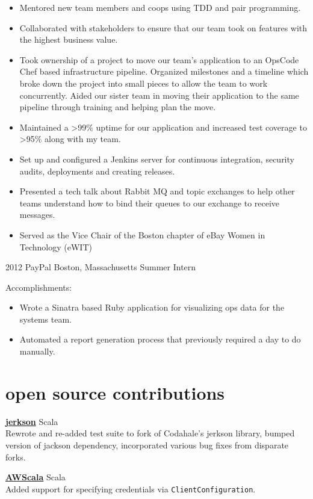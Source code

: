 \documentclass[]{friggeri-cv}
\begin{document}
\begin{entrylist}
{\begin{itemize}
      \item Mentored new team members and coops using TDD and pair programming.
      \item Collaborated with stakeholders to ensure that our team took on features with the highest business value.
      \item Took ownership of a project to move our team's application to an OpsCode Chef based infrastructure pipeline. Organized milestones and a timeline which broke down the project into small pieces to allow the team to work concurrently. Aided our sister team in moving their application to the same pipeline through training and helping plan the move.
      \item Maintained a >99\% uptime for our application and increased test coverage to >95\% along with my team.
      \item Set up and configured a Jenkins server for continuous integration, security audits, deployments and creating releases.
      \item Presented a tech talk about Rabbit MQ and topic exchanges to help other teams understand how to bind their queues to our exchange to receive messages.
      \item Served as the Vice Chair of the Boston chapter of eBay Women in Technology (eWIT)
    \end{itemize}}
  \entryalt
    {2012}
    {PayPal}
    {Boston, Massachusetts}
    {Summer Intern}
    {Accomplishments:
    \begin{itemize}
      \item Wrote a Sinatra based Ruby application for visualizing ops data for the systems team.
      \item Automated a report generation process that previously required a day to do manually.
    \end{itemize}}
\end{entrylist}

\section{open source contributions}

{\href{https://github.com/gilt/jerkson}{\textbf{jerkson}}} \hfill
{\footnotesize{} Scala} \\
Rewrote and re-added test suite to fork of Codahale's jerkson library,
bumped version of jackson dependency, incorporated various bug fixes
from disparate forks.

{\href{https://github.com/seratch/AWScala}{\textbf{AWScala}}} \hfill
{\footnotesize{} Scala} \\
Added support for specifying credentials via \verb|ClientConfiguration|.
\end{document}

